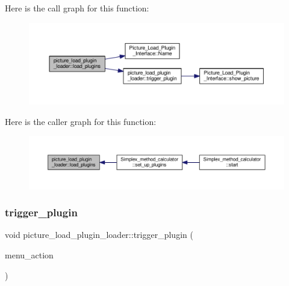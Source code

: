 Here is the call graph for this function\+:\nopagebreak
\begin{figure}[H]
\begin{center}
\leavevmode
\includegraphics[width=350pt]{classpicture__load__plugin__loader_a0e59be47c219103db204896cb89f0720_cgraph}
\end{center}
\end{figure}
Here is the caller graph for this function\+:\nopagebreak
\begin{figure}[H]
\begin{center}
\leavevmode
\includegraphics[width=350pt]{classpicture__load__plugin__loader_a0e59be47c219103db204896cb89f0720_icgraph}
\end{center}
\end{figure}
\mbox{\label{classpicture__load__plugin__loader_a7e8827db78dabf7872b30305e1f29af0}} 
\subsubsection{\texorpdfstring{trigger\+\_\+plugin}{trigger\_plugin}}
{\footnotesize\ttfamily void picture\+\_\+load\+\_\+plugin\+\_\+loader\+::trigger\+\_\+plugin (\begin{DoxyParamCaption}\item[{Q\+Action $\ast$}]{menu\+\_\+action }\end{DoxyParamCaption})\hspace{0.3cm}{\ttfamily [slot]}}



